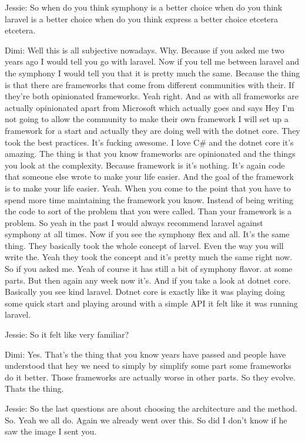 Jessie: So when do you think symphony is a better choice when do you think laravel is a better choice when do you think express a better choice etcetera etcetera.

Dimi: Well this is all subjective nowadays. Why. Because if you asked me two years ago I would tell you go with laravel. Now if you tell me between laravel and the symphony I would tell you that it is pretty much the same. Because the thing is that there are frameworks that come from different communities with their. If they're both opinionated frameworks. Yeah right. And as with all frameworks are actually opinionated apart from Microsoft which actually goes and says Hey I'm not going to allow the community to make their own framework I will set up a framework for a start and actually they are doing well with the dotnet core. They took the best practices. It's fucking awesome. I love C\# and the dotnet core it's amazing. The thing is that you know frameworks are opinionated and the things you look at the complexity. Because framework is it's nothing. It's again code that someone else wrote to make your life easier. And the goal of the framework is to make your life easier. Yeah. When you come to the point that you have to spend more time maintaining the framework you know. Instead of being writing the code to sort of the problem that you were called. Than your framework is a problem. So yeah in the past I would always recommend laravel against symphony at all times. Now if you see the symphony flex and all. It's the same thing. They basically took the whole concept of larvel. Even the way you will write the. Yeah they took the concept and it's pretty much the same right now. So if you asked me. Yeah of course it has still a bit of symphony flavor. at some parts. But then again any week now it's. And if you take a look at dotnet core. Basically you see kind laravel. Dotnet core is exactly like it was playing doing some quick start and playing around with a simple API it felt like it was running laravel.

Jessie: So it felt like very familiar?

Dimi: Yes. That's the thing that you know years have passed and people have understood that hey we need to simply by simplify some part some frameworks do it better. Those frameworks are actually worse in other parts. So they evolve. Thats the thing.

Jessie: So the last questions are about choosing the architecture and the method. So. Yeah we all do. Again we already went over this. So did I don't know if he saw the image I sent you.

